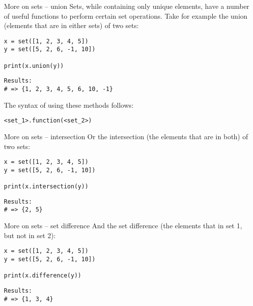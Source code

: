 \documentclass[10pt]{beamer}
\begin{document}
\begin{frame}[label={sec:orgadc7474},fragile]{More on sets -- union}
 Sets, while containing only unique elements, have a number of useful functions to
perform certain set operations. Take for example the union (elements that are in
either sets) of two sets:

\begin{verbatim}
x = set([1, 2, 3, 4, 5])
y = set([5, 2, 6, -1, 10])

print(x.union(y))
\end{verbatim}

\begin{verbatim}
Results: 
# => {1, 2, 3, 4, 5, 6, 10, -1}
\end{verbatim}


The syntax of using these methods follows:

\begin{verbatim}
<set_1>.function(<set_2>)
\end{verbatim}
\end{frame}

\begin{frame}[label={sec:org52d7459},fragile]{More on sets -- intersection}
 Or the intersection (the elements that are in both) of two sets:

\begin{verbatim}
x = set([1, 2, 3, 4, 5])
y = set([5, 2, 6, -1, 10])

print(x.intersection(y))
\end{verbatim}

\begin{verbatim}
Results: 
# => {2, 5}
\end{verbatim}
\end{frame}

\begin{frame}[label={sec:org8d122ca},fragile]{More on sets -- set difference}
 And the set difference (the elements that in set 1, but not in set 2):

\begin{verbatim}
x = set([1, 2, 3, 4, 5])
y = set([5, 2, 6, -1, 10])

print(x.difference(y))
\end{verbatim}

\begin{verbatim}
Results: 
# => {1, 3, 4}
\end{verbatim}
\end{frame}
\end{document}
